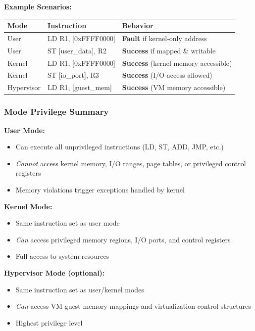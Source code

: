 \documentclass[11pt]{article}
\begin{document}
\textbf{Example Scenarios:}

\begin{table}[h]
\centering
\begin{tabular}{@{}lll@{}}
\toprule
\textbf{Mode} & \textbf{Instruction} & \textbf{Behavior} \\ \midrule
User & LD R1, [0xFFFF0000] & \textbf{Fault} if kernel-only address \\
User & ST [user\_data], R2 & \textbf{Success} if mapped \& writable \\
Kernel & LD R1, [0xFFFF0000] & \textbf{Success} (kernel memory accessible) \\
Kernel & ST [io\_port], R3 & \textbf{Success} (I/O access allowed) \\
Hypervisor & LD R1, [guest\_mem] & \textbf{Success} (VM memory accessible) \\ \bottomrule
\end{tabular}
\end{table}

\subsubsection{Mode Privilege Summary}

\textbf{User Mode:}
\begin{itemize}
    \item Can execute all unprivileged instructions (LD, ST, ADD, JMP, etc.)
    \item \textit{Cannot} access kernel memory, I/O ranges, page tables, or privileged control registers
    \item Memory violations trigger exceptions handled by kernel
\end{itemize}

\textbf{Kernel Mode:}
\begin{itemize}
    \item Same instruction set as user mode
    \item \textit{Can} access privileged memory regions, I/O ports, and control registers
    \item Full access to system resources
\end{itemize}

\textbf{Hypervisor Mode (optional):}
\begin{itemize}
    \item Same instruction set as user/kernel modes
    \item \textit{Can} access VM guest memory mappings and virtualization control structures
    \item Highest privilege level
\end{itemize}
\end{document}

